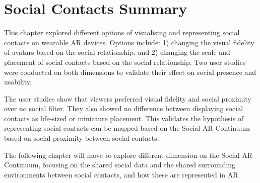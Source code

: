 \pagebreak
\section{Social Contacts Summary}

This chapter explored different options of visualising and representing social contacts on wearable AR devices. Options include: 1) changing the visual fidelity of avatars based on the social relationship, and 2) changing the scale and placement of social contacts based on the social relationship. Two user studies were conducted on both dimensions to validate their effect on social presence and usability. 

The user studies show that viewers preferred visual fidelity and social proximity over no social filter. They also showed no difference between displaying social contacts as life-sized or miniature placement. This validates the hypothesis of representing social contacts can be mapped based on the Social AR Continuum based on social proximity between social contacts. 

The following chapter will move to explore different dimension on the Social AR Continuum, focusing on the shared social data and the shared surrounding environments between social contacts, and how these are represented in AR. 


